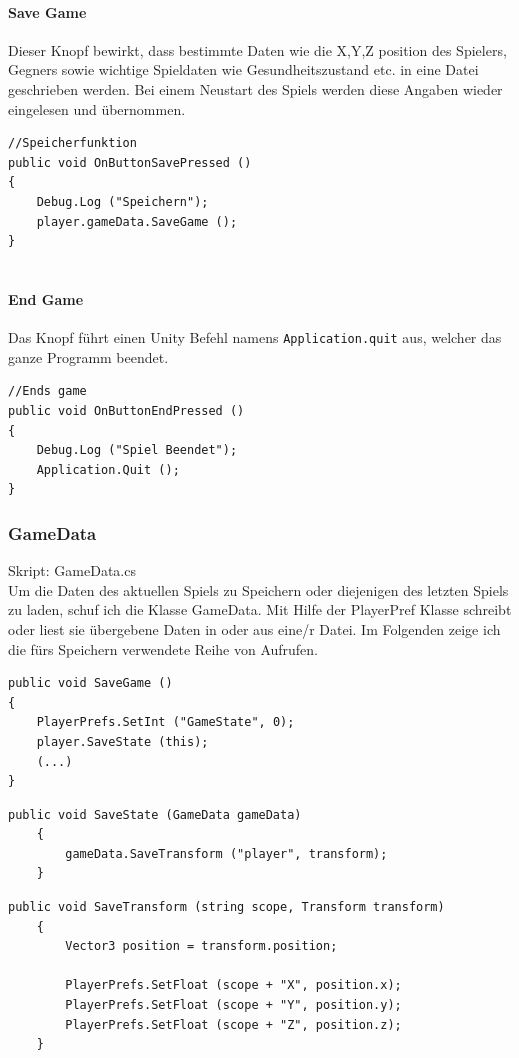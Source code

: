 \paragraph{Save Game}
Dieser Knopf bewirkt, dass bestimmte Daten wie die X,Y,Z position des Spielers, Gegners sowie wichtige Spieldaten wie Gesundheitszustand etc. in eine Datei geschrieben werden. Bei einem Neustart des Spiels werden diese Angaben wieder eingelesen und übernommen.

\begin{lstlisting}[caption={Save Game}]
//Speicherfunktion
public void OnButtonSavePressed ()
{
	Debug.Log ("Speichern");
	player.gameData.SaveGame ();
}
	
\end{lstlisting}

\paragraph{End Game}
Das Knopf führt einen Unity Befehl namens \lstinline{Application.quit}  aus, welcher das ganze Programm beendet. 

\begin{lstlisting}[caption={End Game}]
//Ends game
public void OnButtonEndPressed ()
{
	Debug.Log ("Spiel Beendet");
	Application.Quit ();
}
\end{lstlisting}

\subsubsection{GameData}
Skript: GameData.cs\\
Um die Daten des aktuellen Spiels zu Speichern oder diejenigen des letzten Spiels zu laden, schuf ich die Klasse GameData.
Mit Hilfe der PlayerPref Klasse schreibt oder liest sie übergebene Daten in oder aus eine/r Datei. 
Im Folgenden zeige ich die fürs Speichern verwendete Reihe von Aufrufen.
\begin{lstlisting}[caption={Methode zur Speicherung des Spielstandes in GameData}]
public void SaveGame ()
{
	PlayerPrefs.SetInt ("GameState", 0);
	player.SaveState (this);
	(...)
}
\end{lstlisting}


\begin{lstlisting}[caption={Methode SaveState in Player}]
	public void SaveState (GameData gameData)
	{
		gameData.SaveTransform ("player", transform);
	}
\end{lstlisting}

\begin{lstlisting}[caption={Methode SaveTransform in GameData}]
	public void SaveTransform (string scope, Transform transform)
	{
		Vector3 position = transform.position;

		PlayerPrefs.SetFloat (scope + "X", position.x);
		PlayerPrefs.SetFloat (scope + "Y", position.y);
		PlayerPrefs.SetFloat (scope + "Z", position.z);
	}
\end{lstlisting}

